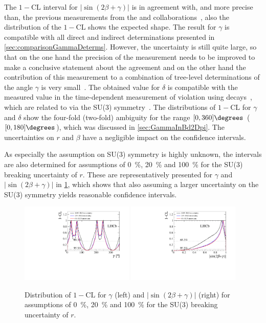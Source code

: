 The $1-\text{CL}$ interval for $\left|\sin\!\left(2\beta+\gamma\right)\right|$ is in agreement with, and more precise than, the previous measurements from the \belle and \babar collaborations~\cite{Ronga:2006hv,Aubert:2006tw}, also the distribution of the $1-\text{CL}$ shows the expected shape.
The result for $\gamma$ is compatible with all direct and indirect determinations presented in \cref{sec:comparisonGammaDeterms}.
However, the uncertainty is still quite large, so that on the one hand the precision of the measurement needs to be improved to make a conclusive statement about the agreement and on the other hand the contribution of this measurement to a combination of tree-level determinations of the angle $\gamma$ is very small~\cite{GammCombo}.
The obtained value for $\delta$ is compatible with the measured value in the time-dependent measurement of \CP violation using \BsToDsK decays~\cite{Aaij:2017lff}, which are related to \BdToDpi via the SU(3) symmetry~\cite{Fleischer:2003yb}.
The distributions of $1-\text{CL}$ for $\gamma$ and $\delta$ show the four-fold (two-fold) ambiguity for the range $[0, 360]\degrees$ ($[0, 180]\degrees$), which was discussed in \cref{sec:GammaInBd2Dpi}.
The uncertainties on $r$ and $\beta$ have a negligible impact on the confidence intervals.

As especially the assumption on SU(3) symmetry is highly unknown, the intervals are also determined for assumptions of \SI{0}{\percent}, \SI{20}{\percent} and \SI{100}{\percent} for the SU(3) breaking uncertainty of $r$.
These are representatively presented for $\gamma$ and $\left|\sin\!\left(2\beta+\gamma\right)\right|$ in \cref{fig:SU3Scan}, which shows that also assuming a larger uncertainty on the SU(3) symmetry yields reasonable confidence intervals.
\begin{figure}[tbp]
    \centering
    \includegraphics[width=0.48\textwidth]{12Result/figs/su3_scan_bd2dpi_g.pdf}
    \includegraphics[width=0.48\textwidth]{12Result/figs/su3_scan_sin2b_plus_gamma.pdf}
    \caption{Distribution of $1-\text{CL}$ for $\gamma$ (left) and $\left|\sin\!\left(2\beta+\gamma\right)\right|$ (right) for assumptions of \SI{0}{\percent}, \SI{20}{\percent} and \SI{100}{\percent} for the SU(3) breaking uncertainty of $r$.}
    \label{fig:SU3Scan}
\end{figure}
